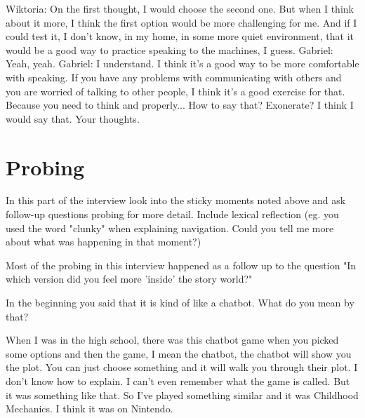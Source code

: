 \begin{QandA}
         \begin{answered}
            Wiktoria: On the first thought, I would choose the second one.
            But when I think about it more, I think the first option would be more challenging for me.
            And if I could test it, I don't know, in my home, in some more quiet environment, that it would be a good way to practice speaking to the machines, I guess.
            Gabriel: Yeah, yeah.
            Gabriel: I understand.
            I think it's a good way to be more comfortable with speaking.
            If you have any problems with communicating with others and you are worried of talking to other people, I think it's a good exercise for that.
            Because you need to think and properly... How to say that?
            Exonerate?
            I think I would say that.
            Your thoughts.


            
         \end{answered}
\end{QandA}






\section{Probing}
In this part of the interview look into the sticky moments noted above and ask follow-up questions probing for more detail.
Include lexical reflection (eg. you used the word "clunky" when explaining navigation. Could you tell me more about what was happening
in that moment?)

Most of the probing in this interview happened as a follow up to the question "In which version did you feel more 'inside' the story world?"

\begin{QandA}
   \item In the beginning you said that it is kind of like a chatbot. What do you mean by that?
   
      \begin{answered}
             When I was in the high school, there was this chatbot game when you picked some options and then the game, I mean the chatbot, the chatbot will show you the plot.
            You can just choose something and it will
            walk you through their plot.
            I don't know how to explain.
            I can't even remember what the game is called.
            But it was something like that.
            So I've played something similar and it was Childhood Mechanics.
            I think it was on Nintendo.
         
      \end{answered}


        
\end{QandA}


